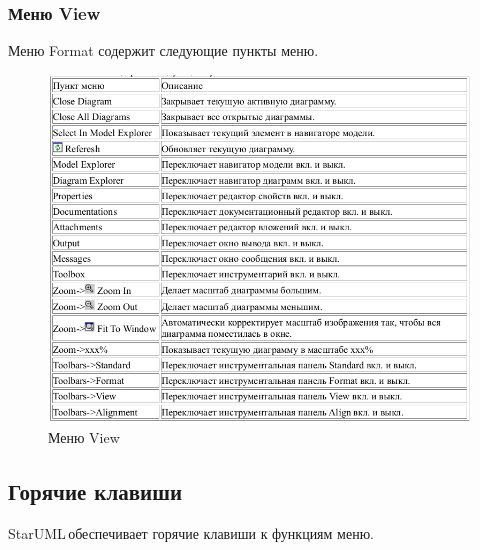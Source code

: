 \documentclass[a4paper,12pt]{extreport}
\newcommand{\staruml}{StarUML\,\tm}
\begin{document}
\subsubsection*{Меню View}
Меню Format содержит следующие пункты меню.
\begin{figure}[h!]
	\centering
	\includegraphics[width=\linewidth]{images/viewmenu}
	\caption{Меню View}
	\label{fig:viewmenu}
\end{figure}


\subsection*{Горячие клавиши}
\staruml обеспечивает горячие клавиши к функциям меню.
\end{document}

